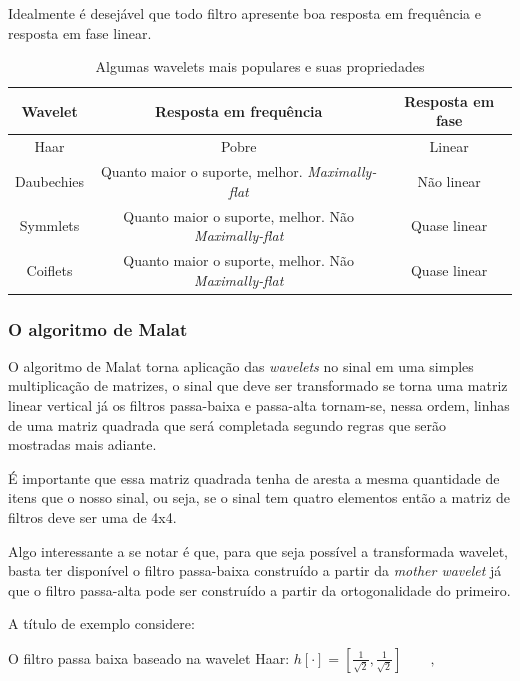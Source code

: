 \documentclass[a4paper,12pt,openright,oneside]{book}
\newenvironment{myenv}[1]
  {\begin{spacing}{#1}}
  {\end{spacing}}
\begin{document}
\begin{myenv}{1.5}
					\par Idealmente é desejável que todo filtro apresente boa resposta em frequência e resposta em fase linear.
					
					\begin{table}[h]
						\centering
						\begin{tabular}{|c|c|c|}
								\hline 
								\textbf{Wavelet} & \textbf{Resposta em frequência} & \textbf{Resposta em fase} \\ 
								\hline 
								Haar & Pobre &  Linear \\ 
								\hline 
								Daubechies & Quanto maior o suporte, melhor. \textit{Maximally-flat}  &  Não linear \\ 
								\hline 
								Symmlets & Quanto maior o suporte, melhor. Não \textit{Maximally-flat} & Quase linear \\ 
								\hline 
								Coiflets & Quanto maior o suporte, melhor. Não \textit{Maximally-flat} & Quase linear \\ 
								\hline 
						\end{tabular} 
						\caption{Algumas wavelets mais populares e suas propriedades}
						\label{tab:waveletsProperties}
					\end{table}
				
				\subsubsection{O algoritmo de Malat}
				\par O algoritmo de Malat torna aplicação das \textit{wavelets} no sinal em uma simples multiplicação de matrizes, o sinal que deve ser transformado se torna uma matriz linear vertical já os filtros passa-baixa e passa-alta tornam-se, nessa ordem, linhas de uma matriz quadrada que será completada segundo regras que serão mostradas mais adiante.
				\par É importante que essa matriz quadrada tenha de aresta a mesma quantidade de itens que o nosso sinal, ou seja, se o sinal tem quatro elementos então a matriz de filtros deve ser uma de 4x4.
				\par Algo interessante a se notar é que, para que seja possível a transformada wavelet, basta ter disponível o filtro passa-baixa construído a partir da \textit{mother wavelet} já que o filtro passa-alta pode ser construído a partir da ortogonalidade do primeiro.
				\par A título de exemplo considere:
				\par O filtro passa baixa baseado na wavelet Haar:
				$h[\cdot] = [\frac{1}{\sqrt{2}}, \frac{1}{\sqrt{2}}]\qquad,$
				

\end{myenv}
\end{document}
